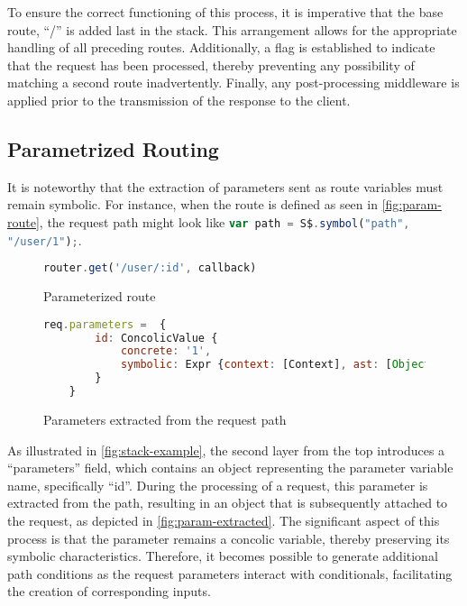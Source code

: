 To ensure the correct functioning of this process, it is imperative that the base route, “/” is added last in the stack. This arrangement allows for the appropriate handling of all preceding routes. Additionally, a flag is established to indicate that the request has been processed, thereby preventing any possibility of matching a second route inadvertently. Finally, any post-processing middleware is applied prior to the transmission of the response to the client.


\subsection{Parametrized Routing}
\label{sec:param-route}

It is noteworthy that the extraction of parameters sent as route variables must remain symbolic. For instance, when the route is defined as seen in \autoref{fig:param-route}, the request path might look like \lstinline[language=JavaScript, gobble=4]{var path = S$.symbol("path", "/user/1");}.


\begin{figure}[ht]
    \begin{lstlisting}[language=JavaScript, gobble=4]
    router.get('/user/:id', callback) 
    \end{lstlisting}
    \caption{Parameterized route}
    \label{fig:param-route}
\end{figure}

\begin{figure}[ht]
    \begin{lstlisting}[language=JavaScript, gobble=4]
    req.parameters =  {
        id: ConcolicValue {
            concrete: '1',
            symbolic: Expr {context: [Context], ast: [Object], _fields: [], checks: []},
        }
    }
    \end{lstlisting}
    \caption{Parameters extracted from the request path}
    \label{fig:param-extracted}
\end{figure}
As illustrated in \autoref{fig:stack-example}, the second layer from the top introduces a “parameters” field, which contains an object representing the parameter variable name, specifically “id”. During the processing of a request, this parameter is extracted from the path, resulting in an object that is subsequently attached to the request, as depicted in \autoref{fig:param-extracted}.
The significant aspect of this process is that the parameter remains a concolic variable, thereby preserving its symbolic characteristics. Therefore, it becomes possible to generate additional path conditions as the request parameters interact with conditionals, facilitating the creation of corresponding inputs.





